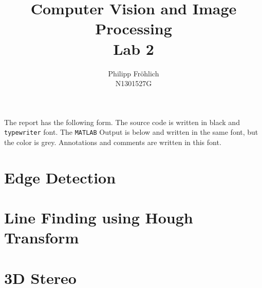 \documentclass[12pt,a4paper]{scrartcl}
\author{Philipp Fröhlich\\ N1301527G}
\title{Computer Vision and Image Processing\\ Lab 2}
\begin{document}
\maketitle
\thispagestyle{empty}

The report has the following form. The source code is written in black and \texttt{typewriter} font. The \texttt{MATLAB} Output is below and written in the same font, but the color is {\color{lightgray} grey}. Annotations and comments are written in this font.
\tableofcontents
\newpage

\section{Edge Detection}

\newpage

\section{Line Finding using Hough Transform}

\newpage


\section{3D Stereo}

\newpage

\end{document}
